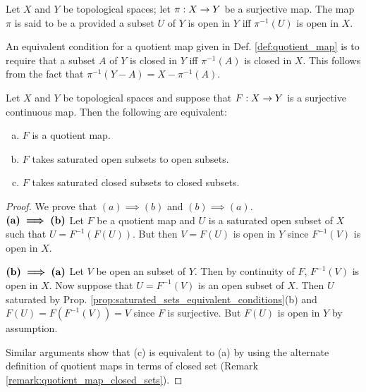 \documentclass[11pt,a4paper]{article}
\begin{document}
\begin{definition}\label{def:quotient_map}
Let $X$ and $Y$ be topological spaces; let $\pi:X\rightarrow Y$ be a surjective map. The map $\pi$ is said to be a  provided a subset $U$ of $Y$ is open in $Y$ iff $\pi^{-1}(U)$ is open in $X$.
\end{definition}

\begin{remark}\label{remark:quotient_map_closed_sets}
An equivalent condition for a quotient map given in Def. \ref{def:quotient_map} is to require that a subset $A$ of $Y$ is closed in $Y$ iff $\pi^{-1}(A)$ is closed in $X$. This follows from the fact that $\pi^{-1}(Y-A) = X - \pi^{-1}(A)$.
\end{remark}

\begin{proposition}\label{prop:quotient_map_equivalent_conditions}
Let $X$ and $Y$ be topological spaces and suppose that $F:X\rightarrow Y$ is a surjective continuous map. Then the following are equivalent:
\begin{enumerate}[(a)]
    \item $F$ is a quotient map.
    \item $F$ takes saturated open subsets to open subsets.
    \item $F$ takes saturated closed subsets to closed subsets.
\end{enumerate}
\end{proposition}

\begin{proof}
We prove that $(a) \implies (b)$ and $(b)\implies (a)$.\\
$\textbf{(a)}\boldsymbol{\implies}\textbf{(b)}$ Let $F$ be a quotient map and $U$ is a saturated open subset of $X$ such that $U = F^{-1}(F(U))$. But then $V = F(U)$ is open in $Y$ since $F^{-1}(V)$ is open in $X$.

\noindent$\textbf{(b)}\boldsymbol{\implies}\textbf{(a)}$ Let $V$ be open an subset of $Y$. Then by continuity of $F$, $F^{-1}(V)$ is open in $X$. Now suppose that $U = F^{-1}(V)$ is an open subset of $X$. Then $U$ saturated by Prop. \ref{prop:saturated_sets_equivalent_conditions}(b) and $F(U) = F(F^{-1}(V)) = V$ since $F$ is surjective. But $F(U)$ is open in $Y$ by assumption.

\noindent Similar arguments show that (c) is equivalent to (a) by using the alternate definition of quotient maps in terms of closed set (Remark \ref{remark:quotient_map_closed_sets}). 
\end{proof}
\end{document}
